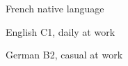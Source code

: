 

\begin{cvpairs}

  
\cvpair
    {French} %
    {native language} %


\cvpair
    {English} %
    {C1, daily at work} %


\cvpair
    {German} %
    {B2, casual at work} %

\end{cvpairs}